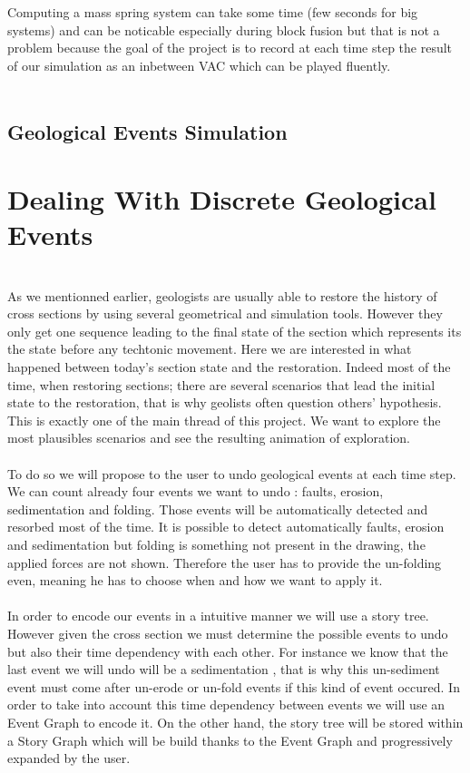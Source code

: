 \documentclass[12pt, a4paper]{memoir} %
\begin{document}
Computing a mass spring system can take some time (few seconds for big systems) and can be noticable especially during block fusion but that is not a problem because the goal of the project is to record at each time step the result of our simulation as an inbetween VAC which can be played fluently.\\\\

\section{Geological Events Simulation}

\chapter{Dealing With Discrete Geological Events}\\

As we mentionned earlier, geologists are usually able to restore the history of cross sections by using several geometrical and simulation tools. However they only get one sequence leading to the final state of the section which represents its the state before any techtonic movement. Here we are interested in what happened between today's section state and the restoration. Indeed most of the time, when restoring sections; there are several scenarios that lead the initial state to the restoration, that is why geolists often question others' hypothesis. This is exactly one of the main thread of this project. We want to explore the most plausibles scenarios and see the resulting animation of exploration.\\\\
To do so we will propose to the user to undo geological events at each time step. We can count already four events we want to undo : faults, erosion, sedimentation and  folding. Those events will be automatically detected and resorbed most of the time. It is possible to detect automatically faults, erosion and sedimentation but folding is something not present in the drawing, the applied forces are not shown. Therefore the user has to provide the un-folding even, meaning he has to choose when and how we want to apply it.\\\\ 

In order to encode our events in a intuitive manner we will use a story tree. However given the cross section we must determine the possible events to undo but also their time dependency with each other. For instance we know that the last event we will undo will be a sedimentation , that is why this un-sediment event must come after un-erode or un-fold events if this kind of event occured. In order to take into account this time dependency between events we will use an Event Graph to encode it. On the other hand, the story tree will be stored within a Story Graph which will be build thanks to the Event Graph and progressively expanded by the user.\\\\
\end{document}
